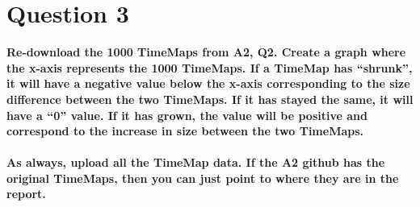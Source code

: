 \chapter{Question 3}
\label{available-representation}

\textbf{Re-download the 1000 TimeMaps from A2, Q2.  Create a graph where the x-axis represents the 1000 TimeMaps.  If a TimeMap has ``shrunk'', it will have a negative value below the x-axis corresponding to the size difference between the two TimeMaps.  If it has stayed the same, it will have a ``0'' value.  If it has grown, the value will be  positive and correspond to the increase in size between the two TimeMaps.\\\\
As always, upload all the TimeMap data.  If the A2 github has the  original TimeMaps, then you can just point to where they are in  the report. }\\\\

